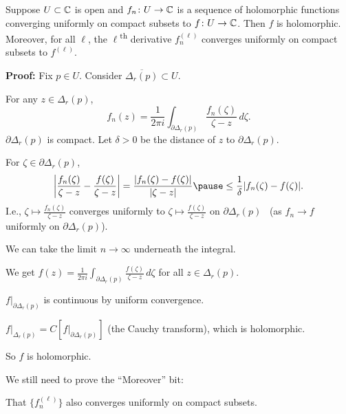 \documentclass[10pt,aspectratio=169]{beamer}
\begin{document}
\begin{frame}

\begin{theorem}
Suppose $U \subset {\mathbb{C}}$ is open and $f_n \colon U \to {\mathbb{C}}$ is a sequence
of holomorphic functions converging uniformly on compact subsets to
$f \colon U \to {\mathbb{C}}$.
\pause
Then $f$ is holomorphic.
\pause
Moreover, for all $\ell$, the $\ell$\textsuperscript{th} derivative
$f_n^{(\ell)}$ converges uniformly on compact subsets to $f^{(\ell)}$.
\end{theorem}

\pause

\textbf{Proof:}
Fix $p \in U$.
\pause
Consider $\overline{\Delta_r(p)} \subset U$.

\medskip
\pause

For any $z \in \Delta_r(p)$,
\[
f_n(z) = \frac{1}{2\pi i}
\int_{\partial \Delta_r(p)} \frac{f_n(\zeta)}{\zeta-z} \, d\zeta .
\]
\pause
$\partial \Delta_r(p)$ is compact.
Let $\delta > 0$ be the distance of $z$ to
$\partial \Delta_r(p)$.

\medskip
\pause

For $\zeta \in \partial \Delta_r(p)$,
\begin{equation*}
\abs{\frac{f_n(\zeta)}{\zeta-z}
-
\frac{f(\zeta)}{\zeta-z}
}
=
\frac{\sabs{f_n(\zeta)-f(\zeta)}}{\sabs{\zeta-z}}
\pause
\leq
\frac{1}{\delta}
\sabs{f_n(\zeta)-f(\zeta)} .
\end{equation*}
\pause
I.e.,
$\zeta \mapsto \frac{f_n(\zeta)}{\zeta-z}$ converges uniformly to 
$\zeta \mapsto \frac{f(\zeta)}{\zeta-z}$ on $\partial \Delta_r(p)$
~(as $f_n \to f$ uniformly on $\partial \Delta_r(p)$).

\medskip
\pause

We can take the limit $n \to \infty$ underneath the integral.
\end{frame}

\begin{frame}
We get
\qquad
$
\displaystyle
f(z) = \frac{1}{2\pi i}
\int_{\partial \Delta_r(p)} \frac{f(\zeta)}{\zeta-z} \, d\zeta
$
\qquad
for all $z \in \Delta_r(p)$.

\medskip
\pause

$f|_{\partial \Delta_r(p)}$ is continuous by uniform convergence.

\medskip
\pause

$f|_{\Delta_r(p)} = C[f|_{\partial \Delta_r(p)}]$ (the Cauchy transform),
which is holomorphic.

\medskip
\pause

So $f$ is holomorphic.

\medskip
\pause

We still need to prove the ``Moreover'' bit:

That $\bigl\{ f_n^{(\ell)} \bigr\}$
also
converges uniformly on compact subsets.
\end{frame}
\end{document}

